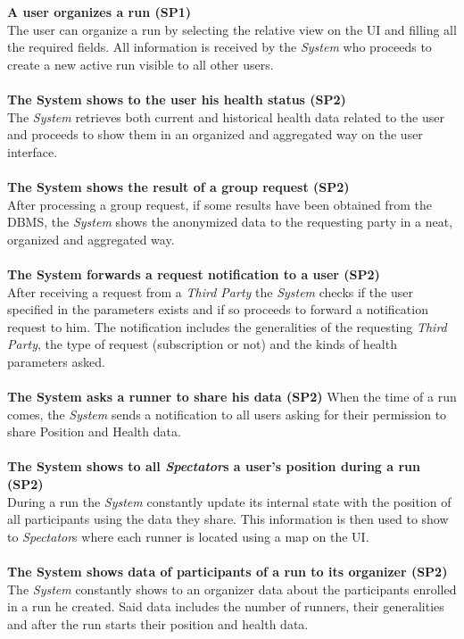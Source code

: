 \documentclass[titlepage]{article}
\begin{document}
{\bf A user organizes a run (SP1)}\\
The user can organize a run by selecting the relative view on the UI and filling all the required fields. All information is received by the {\it System} who proceeds to create a new active run visible to all other users.\\ \\
{\bf The System shows to the user his health status (SP2)} \\
The {\it System} retrieves both current and historical health data related to the user and proceeds to show them in an organized and aggregated way on the user interface.\\ \\
{\bf The System shows the result of a group request (SP2)} \\
After processing a group request, if some results have been obtained from the DBMS, the {\it System} shows the anonymized data to the requesting party in a neat, organized and aggregated way.\\ \\
{\bf The System forwards a request notification to a user (SP2)} \\
After receiving a request from a {\it Third Party} the {\it System} checks if the user specified in the parameters exists and if so proceeds to forward a notification request to him. The notification includes the generalities of the requesting {\it Third Party}, the type of request (subscription or not) and the kinds of health parameters asked.\\ \\
{\bf The System asks a runner to share his data (SP2)}
When the time of a run comes, the {\it System} sends a notification to all users asking for their permission to share Position and Health data.\\ \\
{\bf The System shows to all {\it Spectator}s a user’s position during a run (SP2)} \\
During a run the {\it System} constantly update its internal state with the position of all participants using the data they share. This information is then used to show to {\it Spectator}s where each runner is located using a map on the UI.\\ \\
{\bf The System shows data of participants of a run to its organizer (SP2)} \\
The {\it System} constantly shows to an organizer data about the participants enrolled in a run he created. Said data includes the number of runners, their generalities and after the run starts their position and health data. \\ \\
\end{document}

